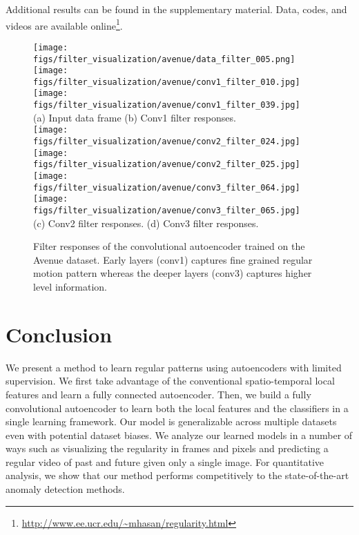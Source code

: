 \documentclass[10pt,twocolumn,letterpaper]{article}
\begin{document}
Additional results can be found in the supplementary material. Data, codes, and videos are available online\footnote{\url{http://www.ee.ucr.edu/~mhasan/regularity.html}}.

\begin{figure}[h]
	\centering
		\texttt{[image: figs/filter\_visualization/avenue/data\_filter\_005.png]}
		\texttt{[image: figs/filter\_visualization/avenue/conv1\_filter\_010.jpg]}
		\texttt{[image: figs/filter\_visualization/avenue/conv1\_filter\_039.jpg]}\\
		{\footnotesize \hspace{-3.5em}(a) Input data frame \hspace{5.5em} (b) Conv1 filter responses.} \\ 
		\vspace{2mm}
\texttt{[image: figs/filter\_visualization/avenue/conv2\_filter\_024.jpg]}
		\texttt{[image: figs/filter\_visualization/avenue/conv2\_filter\_025.jpg]}\hspace{.5em}
		\texttt{[image: figs/filter\_visualization/avenue/conv3\_filter\_064.jpg]}
		\texttt{[image: figs/filter\_visualization/avenue/conv3\_filter\_065.jpg]}\\
		{\footnotesize (c) Conv2 filter responses. \hspace{4em} (d) Conv3 filter responses.} \\
\vspace{1mm}
	\caption{Filter responses of the convolutional autoencoder trained on the Avenue dataset. Early layers (conv1) captures fine grained regular motion pattern whereas the deeper layers (conv3) captures higher level information.}
	\vspace{-1em}
	\label{fig:filter_vis}
\end{figure}









 

\section{Conclusion}
\label{sec:conclusion}

We present a method to learn regular patterns using autoencoders with limited supervision.
We first take advantage of the conventional spatio-temporal local features and learn a fully connected autoencoder.
Then, we build a fully convolutional autoencoder to learn both the local features and the classifiers in a single learning framework.
Our model is generalizable across multiple datasets even with potential dataset biases.
We analyze our learned models in a number of ways such as visualizing the regularity in frames and pixels and predicting a regular video of past and future given only a single image. 
For quantitative analysis, we show that our method performs competitively to the state-of-the-art anomaly detection methods. 
{
\small


}
\end{document}

